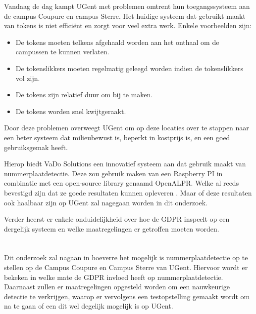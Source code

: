 Vandaag de dag kampt UGent met problemen omtrent hun toegangssysteem aan de campus Coupure en campus Sterre. Het huidige systeem dat gebruikt maakt van tokens is niet efficiënt en zorgt voor veel extra werk. Enkele voorbeelden zijn:
\begin{itemize}
	\item De tokens moeten telkens afgehaald worden aan het onthaal om de campussen te kunnen verlaten.
	\item De tokenslikkers moeten regelmatig geleegd worden indien de tokenslikkers vol zijn.
	\item De tokens zijn relatief duur om bij te maken.
	\item De tokens worden snel kwijtgeraakt.
\end{itemize}
Door deze problemen overweegt UGent om op deze locaties over te stappen naar een beter systeem dat milieubewust is, beperkt in kostprijs is, en een goed gebruiksgemak heeft. 

Hierop biedt VaDo Solutions een innovatief systeem aan dat gebruik maakt van nummerplaatdetectie. Deze zou gebruik maken van een Raspberry PI in combinatie met een open-source library genaamd OpenALPR. Welke al reeds bevestigd zijn dat ze goede resultaten kunnen opleveren \autocite{figuerola2016automated}. Maar of deze resultaten ook haalbaar zijn op UGent zal nagegaan worden in dit onderzoek.

Verder heerst er enkele onduidelijkheid over hoe de GDPR inspeelt op een dergelijk systeem en welke maatregelingen er getroffen moeten worden.

\section{}
\label{sec:onderzoeksvraag}

Dit onderzoek zal nagaan in hoeverre het mogelijk is nummerplaatdetectie op te stellen op de Campus Coupure en Campus Sterre van UGent. Hiervoor wordt er bekeken in welke mate de GDPR invloed heeft op nummerplaatdetectie. Daarnaast zullen er maatregelingen opgesteld worden om een nauwkeurige detectie te verkrijgen, waarop er vervolgens een testopstelling gemaakt wordt om na te gaan of een dit wel degelijk mogelijk is op UGent.

